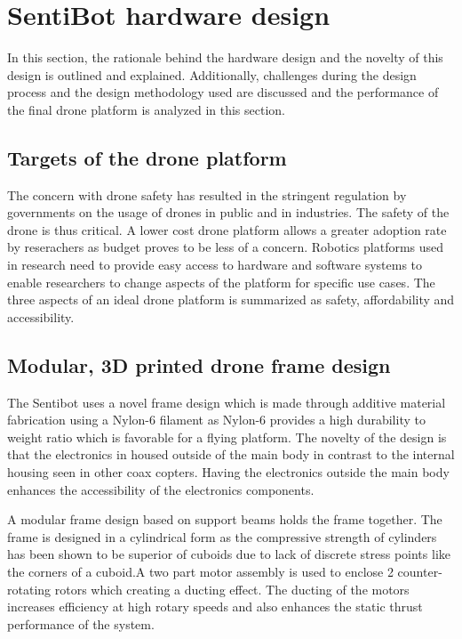 \documentclass[12pt]{article}
\begin{document}
\section{SentiBot hardware design}

In this section, the rationale behind the hardware design and the novelty of this design is outlined and explained. Additionally, challenges during the design process and the design methodology used are discussed and the performance of the final drone platform is analyzed in this section.

\subsection{Targets of the drone platform}

The concern with drone safety has resulted in the stringent regulation by governments on the usage of drones in public and in industries. The safety of the drone is thus critical. A lower cost drone platform allows a greater adoption rate by reserachers as budget proves to be less of a concern.\cite{stateschoolfunding} Robotics platforms used in research need to provide easy access to hardware and software systems to enable researchers to change aspects of the platform for specific use cases\cite{materialrobotics}. The three aspects of an ideal drone platform is summarized as safety, affordability and accessibility. 

\subsection{Modular, 3D printed drone frame design}

The Sentibot uses a novel frame design which is made through additive material fabrication using a Nylon-6 filament as Nylon-6 provides a high durability to weight ratio which is favorable for a flying platform\cite{3Dprinting}. The novelty of the design is that the electronics in housed outside of the main body in contrast to the internal housing seen in other coax copters\cite{SFV}. Having the electronics outside the main body enhances the accessibility of the electronics components. 

A modular frame design based on support beams holds the frame together. The frame is designed in a cylindrical form as the compressive strength of cylinders has been shown to be superior of cuboids due to lack of discrete stress points like the corners of a cuboid\cite{cylinderstrength}.A two part motor assembly is used to enclose 2 counter-rotating rotors which creating a ducting effect. The ducting of the motors increases efficiency at high rotary speeds and also enhances the static thrust performance of the system\cite{ductedfan}.
\end{document}
